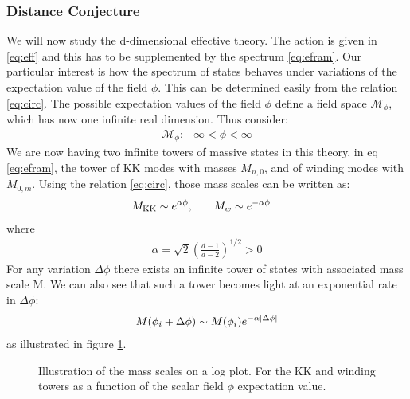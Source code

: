 \subsubsection{Distance Conjecture}
We will now study the d-dimensional effective theory. The action is given in \ref{eq:eff} and this has to be supplemented by the spectrum \ref{eq:efram}. Our particular interest is how the spectrum of states behaves under variations of the expectation value of the field $\phi$. This can be determined easily from the relation \ref{eq:circ}. The possible expectation values of the field $\phi$ define a field space $\mathcal{M}_{\phi}$, which has now one infinite real dimension. Thus consider:
\begin{align}
    \mathcal{M}_{\phi} : -\infty < \phi < \infty
\end{align}
We are now having two infinite towers of massive states in this theory, in eq \ref{eq:efram}, the tower of KK modes with masses $M_{n,0}$, and of winding modes with $M_{0,m}$. Using the relation \ref{eq:circ}, those mass scales can be written as:
\begin{align}
    M_{\text{KK}} \sim e^{\alpha\phi}, & \qq{} M_{w} \sim e^{-\alpha \phi}
\end{align}
where
\begin{align}
    \alpha = \sqrt{2} (\frac{d-1}{d-2})^{1/2} > 0
\end{align}
For any variation $\Delta \phi$ there exists an infinite tower of states with associated mass scale M. We can also see that such a tower becomes light at an exponential rate in $\Delta \phi$:
\begin{align}
    \label{eq:mass}
    M(\phi_{i} + \Delta \phi) \sim M(\phi _{i})e^{-\alpha \abs{\Delta \phi}}
\end{align}
as illustrated in figure \ref{fig:dual}.
\begin{figure}[h]
    \centering
    \caption{Illustration of the mass scales on a log plot. For the KK and winding towers as a function of the scalar field $\phi$ expectation value.}
    \label{fig:dual}
\end{figure}
